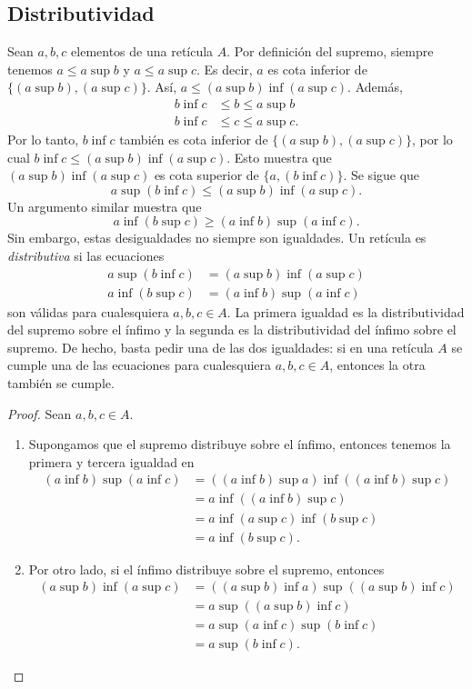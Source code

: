 \subsection*{Distributividad}

Sean $a,b,c$ elementos de una retícula $A$.
Por definición del supremo, siempre tenemos
$a\leq a\sup b$ y $a\leq a\sup c$.
Es decir, $a$ es cota inferior de $\{(a\sup b),(a\sup c)\}$.
Así, $a\leq (a\sup b)\inf(a\sup c)$.
Además,
\begin{align*}
  b\inf c &\leq b\leq a\sup b \\
  b\inf c &\leq c\leq a\sup c.
\end{align*}
Por lo tanto, $b\inf c$ también es cota inferior de $\{(a\sup
b),(a\sup c)\}$, por lo cual $b\inf c\leq(a\sup b)\inf(a\sup c)$.
Esto muestra que $(a\sup b)\inf(a\sup c)$ es cota superior de
$\{a,(b\inf c)\}$. Se sigue que
\[
  a\sup(b\inf c)
  \leq (a\sup b)\inf(a\sup c)
.\]
Un argumento similar muestra que
\[
  a\inf(b\sup c)
  \geq (a\inf b)\sup(a\inf c)
.\]
Sin embargo, estas desigualdades no siempre son igualdades.
Un retícula es \emph{ distributiva } si las ecuaciones
\begin{align*}
  a\sup(b\inf c) &= (a\sup b)\inf (a\sup c) \\
  a\inf(b\sup c) &= (a\inf b)\sup(a\inf c)
\end{align*}
son válidas para cualesquiera $a,b,c\in A$.
La primera igualdad es la distributividad del supremo sobre el
ínfimo y la segunda es la distributividad del ínfimo sobre el
supremo.
De hecho, basta pedir una de las dos igualdades:
si en una retícula $A$ se cumple una de las ecuaciones para
cualesquiera $a,b,c\in A$, entonces la otra también se cumple.
\begin{proof}
    Sean $a,b,c\in A$.
    \begin{enumerate}
      \item
      Supongamos que el supremo distribuye sobre el ínfimo,
      entonces tenemos la primera y tercera igualdad en
      \begin{align*}
          (a\inf b)\sup(a\inf c)
          &= ((a\inf b)\sup a)\inf((a\inf b)\sup c) \\
          &= a\inf((a\inf b)\sup c) \\
          &= a\inf(a\sup c)\inf (b\sup c) \\
          &= a\inf (b\sup c).
      \end{align*}

      \item
      Por otro lado, si el ínfimo distribuye sobre el
      supremo, entonces
      \begin{align*}
          (a\sup b)\inf(a\sup c)
          &= ((a\sup b)\inf a)\sup((a\sup b)\inf c) \\
          &= a\sup((a\sup b)\inf c) \\
          &= a\sup (a\inf c)\sup (b\inf c) \\
          &= a\sup (b\inf c).
      \end{align*}
    \end{enumerate}
\end{proof}


